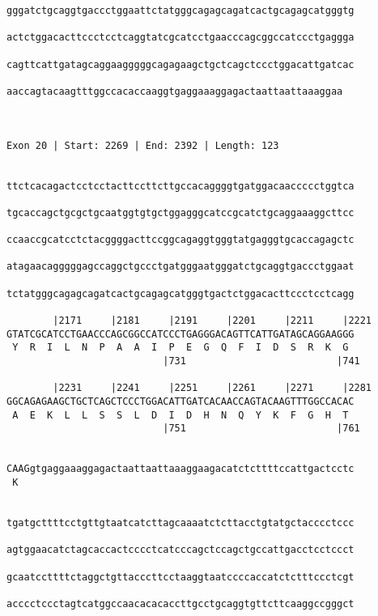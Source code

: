 \documentclass{article}
\begin{document}
\begin{Verbatim}
gggatctgcaggtgaccctggaattctatgggcagagcagatcactgcagagcatgggtg

actctggacacttccctcctcaggtatcgcatcctgaacccagcggccatccctgaggga

cagttcattgatagcaggaagggggcagagaagctgctcagctccctggacattgatcac

aaccagtacaagtttggccacaccaaggtgaggaaaggagactaattaattaaaggaa
                                                          

 
Exon 20 | Start: 2269 | End: 2392 | Length: 123


ttctcacagactcctcctacttccttcttgccacaggggtgatggacaaccccctggtca

tgcaccagctgcgctgcaatggtgtgctggagggcatccgcatctgcaggaaaggcttcc

ccaaccgcatcctctacggggacttccggcagaggtgggtatgagggtgcaccagagctc

atagaacagggggagccaggctgccctgatgggaatgggatctgcaggtgaccctggaat

tctatgggcagagcagatcactgcagagcatgggtgactctggacacttccctcctcagg

        |2171     |2181     |2191     |2201     |2211     |2221
GTATCGCATCCTGAACCCAGCGGCCATCCCTGAGGGACAGTTCATTGATAGCAGGAAGGG
 Y  R  I  L  N  P  A  A  I  P  E  G  Q  F  I  D  S  R  K  G 
                           |731                          |741
  
        |2231     |2241     |2251     |2261     |2271     |2281
GGCAGAGAAGCTGCTCAGCTCCCTGGACATTGATCACAACCAGTACAAGTTTGGCCACAC
 A  E  K  L  L  S  S  L  D  I  D  H  N  Q  Y  K  F  G  H  T 
                           |751                          |761
  
                                                            
CAAGgtgaggaaaggagactaattaattaaaggaagacatctcttttccattgactcctc
 K                                                          
                                                           
  
tgatgcttttcctgttgtaatcatcttagcaaaatctcttacctgtatgctacccctccc
                                                            
agtggaacatctagcaccactcccctcatcccagctccagctgccattgacctcctccct
                                                            
gcaatccttttctaggctgttacccttcctaaggtaatccccaccatctctttccctcgt
                                                            
acccctccctagtcatggccaacacacaccttgcctgcaggtgttcttcaaggccgggct
                                                            

\end{Verbatim}
\end{document}
